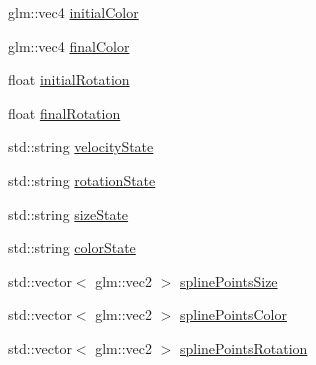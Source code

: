 \begin{DoxyCompactItemize}
\item 
glm\+::vec4 \hyperlink{class_mason_1_1_particle_descriptor_a458d7ca5c19a0bbcf1c73796dbaf3597}{initial\+Color}
\item 
glm\+::vec4 \hyperlink{class_mason_1_1_particle_descriptor_a2b01be3725b46d1f4ef7a6775347be66}{final\+Color}
\item 
float \hyperlink{class_mason_1_1_particle_descriptor_a24f23bf106c1d0bf7dc676d16d64c6d7}{initial\+Rotation}
\item 
float \hyperlink{class_mason_1_1_particle_descriptor_ac588e3cd99709ae248547649b4a6643b}{final\+Rotation}
\item 
std\+::string \hyperlink{class_mason_1_1_particle_descriptor_ac84b802189304538944403fdff16faf2}{velocity\+State}
\item 
std\+::string \hyperlink{class_mason_1_1_particle_descriptor_ac192d2da527967c55804632bc6c0ca9e}{rotation\+State}
\item 
std\+::string \hyperlink{class_mason_1_1_particle_descriptor_a67edecae2a5df1c28ccc2f7cdb0a615f}{size\+State}
\item 
std\+::string \hyperlink{class_mason_1_1_particle_descriptor_aea9d3bf8cd0eaf89a9d34ca698062280}{color\+State}
\item 
std\+::vector$<$ glm\+::vec2 $>$ \hyperlink{class_mason_1_1_particle_descriptor_aefa11cd147ec20d3084c661245abb49c}{spline\+Points\+Size}
\item 
std\+::vector$<$ glm\+::vec2 $>$ \hyperlink{class_mason_1_1_particle_descriptor_a3a7588bd840bc8010f23bda75ec56e5d}{spline\+Points\+Color}
\item 
std\+::vector$<$ glm\+::vec2 $>$ \hyperlink{class_mason_1_1_particle_descriptor_aad86105e768cb5cf59c26d1277ccad2e}{spline\+Points\+Rotation}
\end{DoxyCompactItemize}


